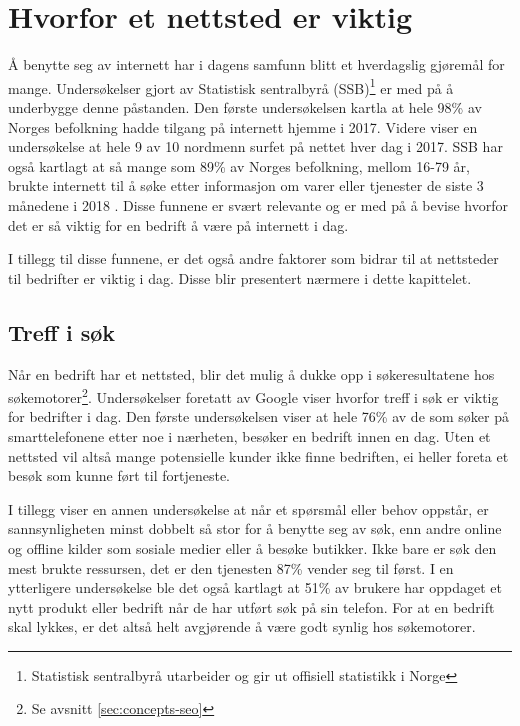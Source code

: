 \section{Hvorfor et nettsted er viktig}
Å benytte seg av internett har i dagens samfunn blitt et hverdagslig gjøremål for mange. Undersøkelser gjort av Statistisk sentralbyrå (SSB)\footnote{Statistisk sentralbyrå utarbeider og gir ut offisiell statistikk i Norge} er med på å underbygge denne påstanden. Den første undersøkelsen \cite{ssb17fim} kartla at hele 98\% av Norges befolkning hadde tilgang på internett hjemme i 2017. Videre viser en undersøkelse \cite{ssb17nat} at hele 9 av 10 nordmenn surfet på nettet hver dag i 2017. SSB har også kartlagt  at så mange som 89\% av Norges befolkning, mellom 16-79 år, brukte internett til å søke etter informasjon om varer eller tjenester de siste 3 månedene i 2018 \cite{ssb18aup}. Disse funnene er svært relevante og er med på å bevise hvorfor det er så viktig for en bedrift å være på internett i dag.

I tillegg til disse funnene, er det også andre faktorer som bidrar til at nettsteder til bedrifter er viktig i dag. Disse blir presentert nærmere i dette kapittelet. 

\subsection{Treff i søk}
\label{sec:search-results}
Når en bedrift har et nettsted, blir det mulig å dukke opp i søkeresultatene hos søkemotorer\footnote{Se avsnitt \ref{sec:concepts-seo}}. Undersøkelser foretatt av Google viser hvorfor treff i søk er viktig for bedrifter i dag. Den første undersøkelsen \cite{google16hms} viser at hele 76\% av de som søker på smarttelefonene etter noe i nærheten, besøker en bedrift innen en dag. Uten et nettsted vil altså mange potensielle kunder ikke finne bedriften, ei heller foreta et besøk som kunne ført til fortjeneste. 

I tillegg viser en annen undersøkelse \cite{google16mhc} at når et spørsmål eller behov oppstår, er sannsynligheten minst dobbelt så stor for å benytte seg av søk, enn andre online og offline kilder som sosiale medier eller å besøke butikker. Ikke bare er søk den mest brukte ressursen, det er den tjenesten 87\% vender seg til først. I en ytterligere undersøkelse  \cite{google16scp} ble det også kartlagt at 51\% av brukere har oppdaget et nytt produkt eller bedrift når de har utført søk på sin telefon. For at en bedrift skal lykkes, er det altså helt avgjørende å være godt synlig hos søkemotorer.


